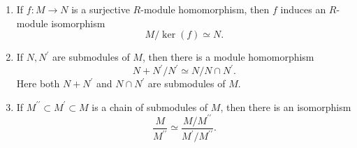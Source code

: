 \begin{theorem}
  \begin{enumerate}
    \item{
      If $f : M \to N$ is a surjective $R$-module homomorphism, then
      $f$ induces an $R$-module isomorphism
      $$
      M / \ker(f) \simeq N.
      $$
    }
    \item{
      If $N, N^\prime$ are submodules of $M$, then there is a module
      homomorphism
      $$
      N + N^\prime / N^\prime \simeq N / N \cap N^\prime.
      $$
      Here both $N + N^\prime$ and $N \cap N^\prime$ are submodules of $M$.
    }
    \item{
      If $M^{\prime\prime} \subset M^\prime \subset M$ is a chain of
      submodules of $M$, then there is an isomorphism
      $$
             \frac{M}{M^{\prime\prime}}
      \simeq \frac{M / M^{\prime\prime}}{M^\prime / M^{\prime\prime}}.
      $$
    }
  \end{enumerate}
\end{theorem}
